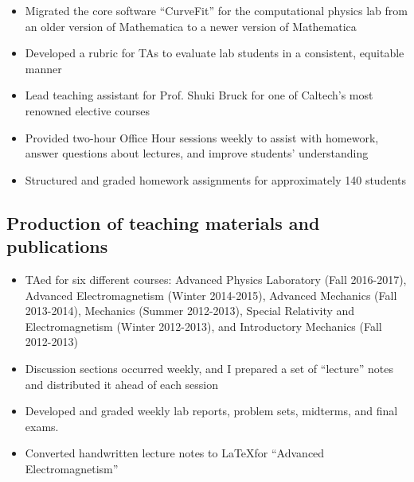 \begin{itemize}
	\item Migrated the core software \enquote{CurveFit} for the computational physics lab from an older version of Mathematica to a newer version of Mathematica
	\item Developed a rubric for TAs to evaluate lab students in a consistent, equitable manner
\end{itemize}

\begin{itemize}
	\item Lead teaching assistant for Prof. Shuki Bruck for one of Caltech's most renowned elective courses
	\item Provided two-hour Office Hour sessions weekly to assist with homework, answer questions about lectures, and improve students' understanding
	\item Structured and graded homework assignments for approximately 140 students
\end{itemize}

\subsection{Production of teaching materials and publications}\label{ssec:production-of-teaching-materials-and-publications}

\begin{itemize}
	\item TAed for six different courses: Advanced Physics Laboratory (Fall 2016-2017), Advanced Electromagnetism (Winter 2014-2015), Advanced Mechanics (Fall 2013-2014), Mechanics (Summer 2012-2013), Special Relativity and Electromagnetism (Winter 2012-2013), and Introductory Mechanics (Fall 2012-2013)
	\item Discussion sections occurred weekly, and I prepared a set of \enquote{lecture} notes and distributed it ahead of each session
	\item Developed and graded weekly lab reports, problem sets, midterms, and final exams.
	\item Converted handwritten lecture notes to \LaTeX for \enquote{Advanced Electromagnetism}
\end{itemize}

